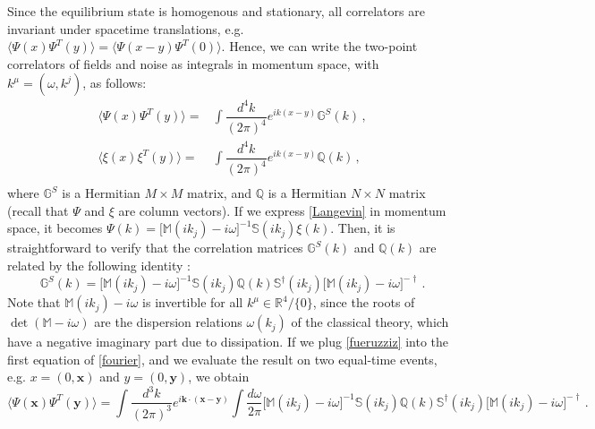 \documentclass[a4paper, amsfonts, amssymb, amsmath, reprint, showkeys, nofootinbib, twoside,notitlepage,onecolumn]{revtex4-2}
\newcommand{\Ma}{{\mathbb{M}}}
\newcommand{\Sa}{{\mathbb{S}}}
\newcommand{\Ga}{{\mathbb{G}}}
\newcommand{\Qa}{{\mathbb{Q}}}
\newcommand{\x}{{\textbf{x}}}
\newcommand{\y}{{\textbf{y}}}
\newcommand{\kb}{{\textbf{k}}}
\theoremstyle{definition}
\begin{document}
Since the equilibrium state is homogenous and stationary, all correlators are invariant under spacetime translations, e.g. $\langle \Psi(x) \Psi^T(y)\rangle=\langle \Psi(x-y) \Psi^T(0)\rangle$. Hence, we can write the two-point correlators of fields and noise as integrals in momentum space, with $k^\mu=(\omega,k^j)$, as follows:
\begin{equation}\label{fourier}
    \begin{split}
\langle \Psi(x) \Psi^T(y)\rangle ={}& \int \dfrac{d^4 k}{(2\pi)^4} e^{i k (x-y)} \Ga^S (k) \, , \\
\langle \xi(x) \xi^T(y)\rangle ={}&  \int \dfrac{d^4 k}{(2\pi)^4} e^{i k (x-y)} \Qa (k) \, , \\
    \end{split}
\end{equation}
where $\Ga^S$ is a Hermitian $M \times M$ matrix, and $\Qa$ is a Hermitian $N \times N$ matrix (recall that $\Psi$ and $\xi$ are column vectors).
If we express \eqref{Langevin} in momentum space, it becomes $\Psi(k)=\big[\Ma(ik_j)-i\omega\big]^{-1} \Sa(ik_j) \xi(k)$. Then, it is straightforward to verify that the correlation matrices $\Ga^S(k)$ and $\Qa(k)$ are related by the following identity \cite{FoxUhlFluctuations1970}:
\begin{equation}\label{fueruzziz}
    \Ga^S(k)=\big[\Ma(ik_j){-}i\omega\big]^{-1} \Sa(ik_j) \Qa(k) \Sa^\dagger(ik_j)\big[\Ma(ik_j){-}i\omega\big]^{-\dagger} \, .
\end{equation}
Note that $\Ma(ik_j){-}i\omega$ is invertible for all $k^\mu \in \mathbb{R}^4/\{0\}$, since the roots of $\det (\Ma-i\omega)$ are the dispersion relations $\omega(k_j)$ of the classical theory, which have a negative imaginary part due to dissipation.
If we plug \eqref{fueruzziz} into the first equation of \eqref{fourier}, and we evaluate the result on two equal-time events, e.g. $x=(0,\x)$ and $y=(0,\y)$, we obtain
\begin{equation}\label{long}
 \langle \Psi(\x) \Psi^T(\y)\rangle = \int \dfrac{d^3 k}{(2\pi)^3} e^{i \kb \cdot (\x-\y)} \int \dfrac{d\omega}{2\pi} \big[\Ma(ik_j){-}i\omega\big]^{-1} \Sa(ik_j) \Qa(k) \Sa^\dagger(ik_j)\big[\Ma(ik_j){-}i\omega\big]^{-\dagger}  \, .   
\end{equation}
\end{document}
